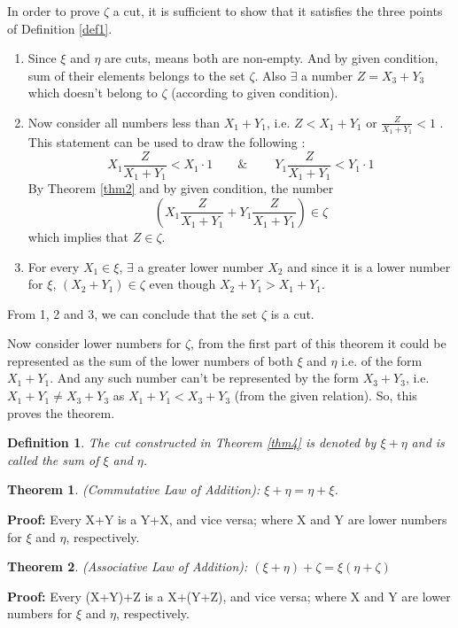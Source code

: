 \documentclass[12pt,a4paper,final,titlepage]{article}
\newtheorem{dfn}{Definition}
\newtheorem{thm}{Theorem}
\begin{document}
In order to prove $\zeta$ a cut, it is sufficient to show that it satisfies the three points of Definition \ref{def1}. \\
\begin{enumerate}
\item Since $\xi$ and $\eta$ are cuts, means both are non-empty. And by given condition, sum of their elements belongs to the set $\zeta$. Also $\exists$ a number $Z=X_3+Y_3$ which doesn't belong to $\zeta$ (according to given condition).
\item Now consider all numbers less than $X_1+Y_1$, i.e. $Z<X_1+Y_1$ or $\frac{Z}{X_1+Y_1} < 1$ . This statement can be used to draw the following :
\begin{equation}
X_1\dfrac{Z}{X_1+Y_1} < X_1\cdot1 \qquad \&\ \qquad Y_1\dfrac{Z}{X_1+Y_1} < Y_1\cdot1 \nonumber
\end{equation}
By Theorem \ref{thm2} and by given condition, the number
\begin{equation}
( X_1\dfrac{Z}{X_1+Y_1} + Y_1\dfrac{Z}{X_1+Y_1} ) \in \zeta \nonumber
\end{equation}
which implies that $Z\in \zeta$.
\item For every $X_1\in \xi$, $\exists$ a greater lower number $X_2$ and since it is a lower number for $\xi$, $(X_2+Y_1) \in \zeta$ even though $X_2+Y_1 > X_1+Y_1$.
\end{enumerate}
From 1, 2 and 3, we can conclude that the set $\zeta$ is a cut.\\ \medskip

Now consider lower numbers for $\zeta$, from the first part of this theorem it could be represented as the sum of the lower numbers of both $\xi$ and $\eta$ i.e. of the form $X_1+Y_1$. And any such number can't be represented by the form $X_3+Y_3$, i.e. $X_1+Y_1 \neq X_3+Y_3$ as $X_1+Y_1 < X_3+Y_3$ (from the given relation).
So, this proves the theorem.
\bigskip

\begin{dfn}\label{def5}
The cut constructed in Theorem \ref{thm4} is denoted by $\xi+\eta$ and is called the sum of $\xi$ and $\eta$.
\end{dfn}
\begin{thm} (Commutative Law of Addition):
$\xi+\eta = \eta+\xi$.
\end{thm}
\textbf{Proof:} Every X+Y is a Y+X, and vice versa; where X and Y are lower numbers for $\xi$ and $\eta$, respectively.

\begin{thm} (Associative Law of Addition):
$(\xi+\eta)+\zeta = \xi(\eta+\zeta)$
\end{thm}
\textbf{Proof:} Every (X+Y)+Z is a X+(Y+Z), and vice versa; where X and Y are lower numbers for $\xi$ and $\eta$, respectively.
\end{document}
